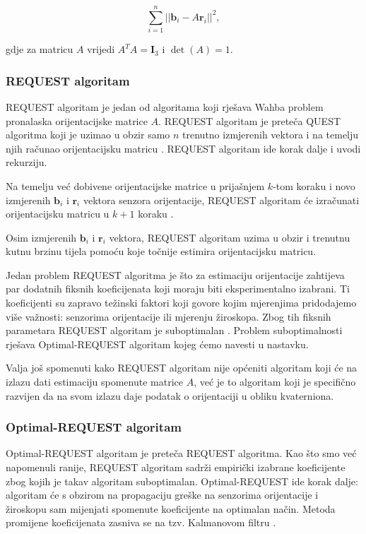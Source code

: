 \documentclass[times, utf8, diplomski, numeric]{templates/template}
\begin{document}
{{{{                \begin{equation}
                    \sum_{i=1}^{n}||\boldsymbol{b}_i - A\boldsymbol{r}_i||^2,
                \end{equation}

                gdje za matricu $A$ vrijedi $A^T A = \boldsymbol{I}_3$ i $\det(A)=1.$
            }

            \subsubsection{REQUEST algoritam}{
                REQUEST algoritam je jedan od algoritama koji rješava Wahba problem pronalaska orijentacijske matrice $A$. REQUEST algoritam je preteča QUEST algoritma koji je uzimao u obzir samo $n$ trenutno izmjerenih vektora i na temelju njih računao orijentacijsku matricu \cite{quest_algo}. REQUEST algoritam ide korak dalje i uvodi rekurziju. 

                Na temelju već dobivene orijentacijske matrice u prijašnjem $k$-tom koraku i novo izmjerenih $\boldsymbol{b}_i$ i $\boldsymbol{r}_i$ vektora senzora orijentacije, REQUEST algoritam će izračunati orijentacijsku matricu u $k+1$ koraku \cite{request_algo}.

                Osim izmjerenih $\boldsymbol{b}_i$ i $\boldsymbol{r}_i$ vektora, REQUEST algoritam uzima u obzir i trenutnu kutnu brzinu tijela pomoću koje točnije estimira orijentacijsku matricu. 

                Jedan problem REQUEST algoritma je što za estimaciju orijentacije zahtijeva par dodatnih fiksnih koeficijenata koji moraju biti eksperimentalno izabrani. Ti koeficijenti su zapravo težinski faktori koji govore kojim mjerenjima pridodajemo više važnosti: senzorima orijentacije ili mjerenju žiroskopa. Zbog tih fiksnih parametara REQUEST algoritam je suboptimalan \cite{opt_req_algo}. Problem suboptimalnosti rješava Optimal-REQUEST algoritam kojeg ćemo navesti u nastavku.

                Valja još spomenuti kako REQUEST algoritam nije općeniti algoritam koji će na izlazu dati estimaciju spomenute matrice $A$, već je to algoritam koji je specifično razvijen da na svom izlazu daje podatak o orijentaciji u obliku kvaterniona.
            }

            \subsubsection{Optimal-REQUEST algoritam}{
                Optimal-REQUEST algoritam je preteča REQUEST algoritma. Kao što smo već napomenuli ranije, REQUEST algoritam sadrži empirički izabrane koeficijente zbog kojih je takav algoritam suboptimalan. Optimal-REQUEST ide korak dalje: algoritam će s obzirom na propagaciju greške na senzorima orijentacije i žiroskopu sam mijenjati spomenute koeficijente na optimalan način. Metoda promijene koeficijenata zasniva se na tzv. Kalmanovom filtru \cite{opt_req_algo}.

}}}}
\end{document}
